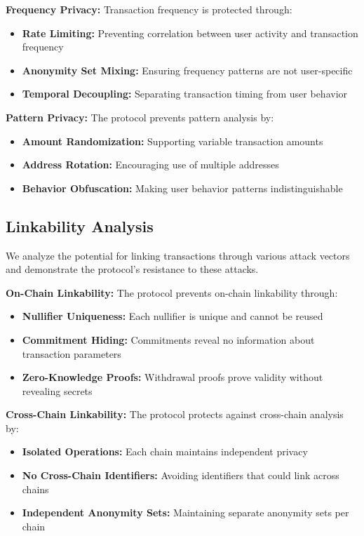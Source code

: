 \documentclass[11pt,a4paper]{article}
\begin{document}
\textbf{Frequency Privacy:}
Transaction frequency is protected through:

\begin{itemize}
    \item \textbf{Rate Limiting:} Preventing correlation between user activity and transaction frequency
    \item \textbf{Anonymity Set Mixing:} Ensuring frequency patterns are not user-specific
    \item \textbf{Temporal Decoupling:} Separating transaction timing from user behavior
\end{itemize}

\textbf{Pattern Privacy:}
The protocol prevents pattern analysis by:

\begin{itemize}
    \item \textbf{Amount Randomization:} Supporting variable transaction amounts
    \item \textbf{Address Rotation:} Encouraging use of multiple addresses
    \item \textbf{Behavior Obfuscation:} Making user behavior patterns indistinguishable
\end{itemize}

\subsection{Linkability Analysis}

We analyze the potential for linking transactions through various attack vectors and demonstrate the protocol's resistance to these attacks.

\textbf{On-Chain Linkability:}
The protocol prevents on-chain linkability through:

\begin{itemize}
    \item \textbf{Nullifier Uniqueness:} Each nullifier is unique and cannot be reused
    \item \textbf{Commitment Hiding:} Commitments reveal no information about transaction parameters
    \item \textbf{Zero-Knowledge Proofs:} Withdrawal proofs prove validity without revealing secrets
\end{itemize}

\textbf{Cross-Chain Linkability:}
The protocol protects against cross-chain analysis by:

\begin{itemize}
    \item \textbf{Isolated Operations:} Each chain maintains independent privacy
    \item \textbf{No Cross-Chain Identifiers:} Avoiding identifiers that could link across chains
    \item \textbf{Independent Anonymity Sets:} Maintaining separate anonymity sets per chain
\end{itemize}
\end{document}
